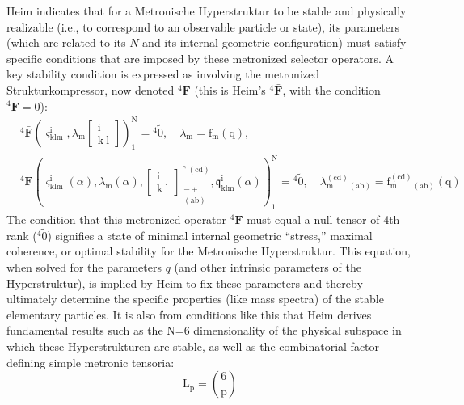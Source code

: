 \documentclass[12pt]{article}
\newcommand{\q}[1]{\enquote{#1}}
\newcommand{\metronisiertekondensor}[1]{{}^{#1}\mathbf{F}}
\begin{document}
\begin{itemize}
    Heim indicates that for a Metronische Hyperstruktur to be stable and physically realizable (i.e., to correspond to an observable particle or state), its parameters (which are related to its  \(N\) and its internal geometric configuration) must satisfy specific conditions that are imposed by these metronized selector operators. A key stability condition is expressed as involving the metronized Strukturkompressor, now denoted \( \metronisiertekondensor{4} \) (this is Heim's \( {}^4\bar{\mathbf{F}} \), with the condition \( \metronisiertekondensor{4}=0 \)):
    \begin{equation}
    \begin{aligned}
    & {}^4\bar{\mathbf{F}} \left( \varsigma^{\mathrm{i}}_{\mathrm{klm}}, \lambda_\mathrm{m} \left[ \begin{matrix} \mathrm{i} \\ \mathrm{k\ l} \end{matrix} \right] \right)_1^\mathrm{N} = {}^4\tilde{0}, \quad \lambda_\mathrm{m} = \mathrm{f_m}(\mathrm{q}), \\
    & {}^4\bar{\mathbf{F}} \left( \varsigma^{\mathrm{i}}_{\mathrm{klm}}(\alpha), \lambda_\mathrm{m}(\alpha), \left[ \begin{matrix} \mathrm{i} \\ \mathrm{k\ l} \end{matrix} \right]^{\urcorner(\mathrm{cd})}_{\substack{- + \\ (\mathrm{ab})}}, \mathfrak{q}^{\mathrm{i}}_{\mathrm{klm}}(\alpha) \right)_1^\mathrm{N} = {}^4\tilde{0}, \quad \lambda_{\mathrm{m}}^{(\mathrm{cd})}_{(\mathrm{ab})} = \mathrm{f}_{\mathrm{m}}^{(\mathrm{cd})}_{(\mathrm{ab})}(\mathrm{q})
    \end{aligned} \tag{100}
    \label{eq:original_final_stability_condition}
    \end{equation}
    The condition that this metronized operator \( \metronisiertekondensor{4} \) must equal a null tensor of 4th rank (\( {}^{4}\tilde{0} \)) signifies a state of minimal internal geometric \q{stress,} maximal coherence, or optimal stability for the Metronische Hyperstruktur. This equation, when solved for the parameters \(q\) (and other intrinsic parameters of the Hyperstruktur), is implied by Heim to fix these parameters and thereby ultimately determine the specific properties (like mass spectra) of the stable elementary particles. It is also from conditions like this that Heim derives fundamental results such as the N=6 dimensionality of the physical subspace in which these Hyperstrukturen are stable, as well as the combinatorial factor defining simple metronic tensoria:
    \begin{equation}
    \mathrm{L_p} = \binom{6}{\mathrm{p}} \tag{100a}
    \end{equation}


\end{itemize}
\end{document}
